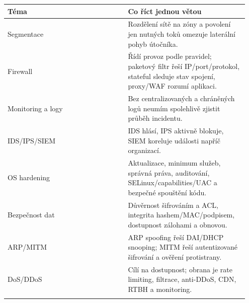 \documentclass[11pt,a4paper]{article}
\begin{document}
\begin{longtable}{p{0.475\linewidth}p{0.475\linewidth}}
\toprule
\textbf{Téma} & \textbf{Co říct jednou větou} \\
\midrule\endhead
Segmentace & Rozdělení sítě na zóny a povolení jen nutných toků omezuje laterální pohyb útočníka. \\
\addlinespace
Firewall & Řídí provoz podle pravidel; paketový filtr řeší IP/port/protokol, stateful sleduje stav spojení, proxy/WAF rozumí aplikaci. \\
\addlinespace
Monitoring a logy & Bez centralizovaných a chráněných logů neumím spolehlivě zjistit průběh incidentu. \\
\addlinespace
IDS/IPS/SIEM & IDS hlásí, IPS aktivně blokuje, SIEM koreluje události napříč organizací. \\
\addlinespace
OS hardening & Aktualizace, minimum služeb, správná práva, auditování, SELinux/capabilities/UAC a bezpečné spouštění kódu. \\
\addlinespace
Bezpečnost dat & Důvěrnost šifrováním a ACL, integrita hashem/MAC/podpisem, dostupnost zálohami a obnovou. \\
\addlinespace
ARP/MITM & ARP spoofing řeší DAI/DHCP snooping; MITM řeší autentizované šifrování a ověření protistrany. \\
\addlinespace
DoS/DDoS & Cílí na dostupnost; obrana je rate limiting, filtrace, anti-DDoS, CDN, RTBH a monitoring. \\
\addlinespace
\bottomrule
\end{longtable}

\newpage
\end{document}
